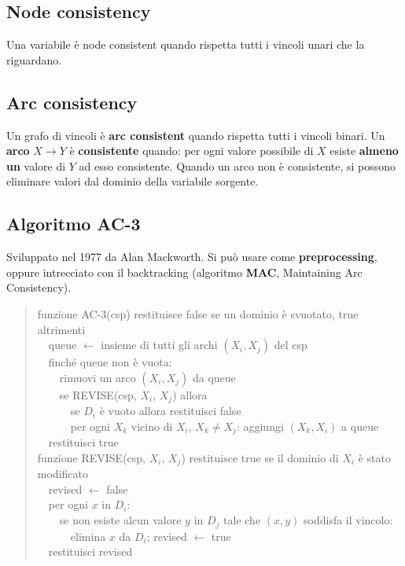 \documentclass[11pt,a4paper]{report}
\begin{document}
\subsection*{Node consistency}

Una variabile è node consistent quando rispetta tutti i vincoli unari che la riguardano.

\subsection*{Arc consistency}

Un grafo di vincoli è \textbf{arc consistent} quando rispetta tutti i vincoli binari. Un \textbf{arco} $X\to Y$ è \textbf{consistente} quando: per ogni valore possibile di $X$ esiste \textbf{almeno un} valore di $Y$ ad esso consistente. Quando un arco non è consistente, si possono eliminare valori dal dominio della variabile sorgente.

\subsection*{Algoritmo AC-3}

Sviluppato nel 1977 da Alan Mackworth. Si può usare come \textbf{preprocessing}, oppure intrecciato con il backtracking (algoritmo \textbf{MAC}, Maintaining Arc Consistency).

\begin{quote}
\ttfamily
funzione AC-3(csp) restituisce false se un dominio è svuotato, true altrimenti\\
\ \ queue $\leftarrow$ insieme di tutti gli archi $(X_i,X_j)$ del csp\\
\ \ finché queue non è vuota:\\
\ \ \ \ rimuovi un arco $(X_i,X_j)$ da queue\\
\ \ \ \ se REVISE(csp, $X_i$, $X_j$) allora\\
\ \ \ \ \ \ se $D_i$ è vuoto allora restituisci false\\
\ \ \ \ \ \ per ogni $X_k$ vicino di $X_i$, $X_k \ne X_j$: aggiungi $(X_k,X_i)$ a queue\\
\ \ restituisci true\\[4pt]
funzione REVISE(csp, $X_i$, $X_j$) restituisce true se il dominio di $X_i$ è stato modificato\\
\ \ revised $\leftarrow$ false\\
\ \ per ogni $x$ in $D_i$:\\
\ \ \ \ se non esiste alcun valore $y$ in $D_j$ tale che $(x,y)$ soddisfa il vincolo:\\
\ \ \ \ \ \ elimina $x$ da $D_i$; revised $\leftarrow$ true\\
\ \ restituisci revised
\end{quote}
\end{document}
